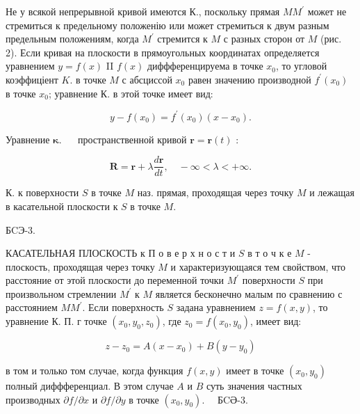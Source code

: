 \documentclass[10pt]{article}
\begin{document}
Не у всякой непрерывной кривой имеются К., поскольку прямая $M M^{\prime}$ может не стремиться к предельному положенію или может стремиться к двум разным предельным положениям, когда $M^{\prime}$ стремится к $M$ с разных сторон от $M$ (рис. 2). Если кривая на плоскости в прямоугольных координатах определяется уравнением $y=f(x)$ II $f(x)$ диффференцируема в точке $x_{0}$, то угловой коэффиціент $K$. в точке $M$ с абсциссой $x_{0}$ равен значению производной $f^{\prime}\left(x_{0}\right)$ в точке $x_{0}$; уравнение К. в этой точке имеет вид:



\[

y-f\left(x_{0}\right)=f^{\prime}\left(x_{0}\right)\left(x-x_{0}\right) .

\]



Уравнение $\boldsymbol{\kappa}$. $\quad$ пространственной кривой $\boldsymbol{r}=\boldsymbol{r}(t)$ :



\[

\boldsymbol{R}=\boldsymbol{r}+\lambda \frac{d \boldsymbol{r}}{d t}, \quad-\infty<\lambda<+\infty .

\]



К. к поверхности $S$ в точке $M$ наз. прямая, проходящая через точку $M$ и лежащая в касательной плоскости к $S$ в точке $M$.



БCЭ-3.



КАСАТЕЛЬНАЯ ПЛОСКОСТЬ к П о в е р х н о с т и $S$ в т о ч к е $M$ - плоскость, проходящая через точку $M$ и характеризующаяся тем свойством, что расстояние от этой плоскости до переменной точки $M^{\prime}$ поверхности $S$ при произвольном стремлении $M^{\prime}$ к $M$ является бесконечно малым по сравнению с расстоянием $M M^{\prime}$. Если поверхность $S$ задана уравнением $z=f(x, y)$, то уравнение К. П. г точке $\left(x_{0}, y_{0}, z_{0}\right)$, где $z_{0}=f\left(x_{0}, y_{0}\right)$, имеет вид:



\[

z-z_{0}=A\left(x-x_{0}\right)+B\left(y-y_{0}\right)

\]



в том и только том случае, когда функция $f(x, y)$ имеет в точке $\left(x_{0}, y_{0}\right)$ полный диффференциал. В этом случае $A$ и $B$ суть значения частных производных $\partial f / \partial x$ и $\partial f / \partial y$ в точке $\left(x_{0}, y_{0}\right) . \quad$ БCӘ-3.
\end{document}
